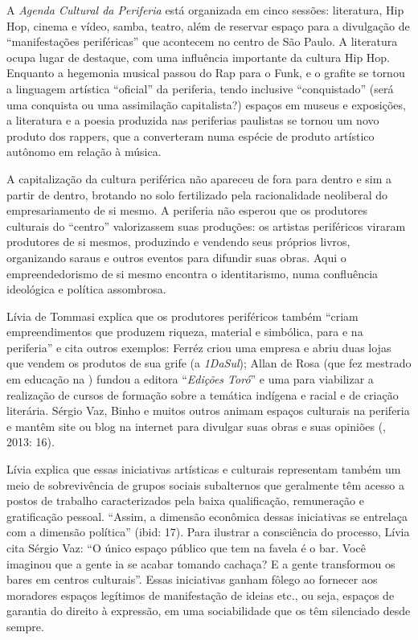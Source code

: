 A \emph{Agenda Cultural da Periferia} está organizada em cinco sessões:
literatura, Hip Hop, cinema e vídeo, samba, teatro, além de reservar
espaço para a divulgação de ``manifestações periféricas'' que acontecem
no centro de São Paulo. A literatura ocupa lugar de destaque, com uma
influência importante da cultura Hip Hop. Enquanto a hegemonia musical
passou do Rap para o Funk, e o grafite se tornou a linguagem artística
``oficial'' da periferia, tendo inclusive ``conquistado'' (será uma
conquista ou uma assimilação capitalista?) espaços em museus e
exposições, a literatura e a poesia produzida nas periferias paulistas
se tornou um novo produto dos rappers, que a converteram numa espécie de
produto artístico autônomo em relação à música.

A capitalização da cultura periférica não apareceu de fora para dentro e
sim a partir de dentro, brotando no solo fertilizado pela racionalidade
neoliberal do empresariamento de si mesmo. A periferia não esperou que
os produtores culturais do ``centro'' valorizassem suas produções: os
artistas periféricos viraram produtores de si mesmos, produzindo e
vendendo seus próprios livros, organizando saraus e outros eventos para
difundir suas obras. Aqui o empreendedorismo de si mesmo encontra o
identitarismo, numa confluência ideológica e política assombrosa.

Lívia de Tommasi explica que os produtores periféricos também ``criam
empreendimentos que produzem riqueza, material e simbólica, para e na
periferia'' e cita outros exemplos: Ferréz criou uma empresa e abriu
duas lojas que vendem os produtos de sua grife (a \emph{1DaSul}); Allan
de Rosa (que fez mestrado em educação na ) fundou a editora
``\emph{Edições Toró}'' e uma  para viabilizar a realização de cursos
de formação sobre a temática indígena e racial e de criação literária.
Sérgio Vaz, Binho e muitos outros animam espaços culturais na periferia
e mantêm site ou blog na internet para divulgar suas obras e suas
opiniões (, 2013: 16).

Lívia explica que essas iniciativas artísticas e culturais representam
também um meio de sobrevivência de grupos sociais subalternos que
geralmente têm acesso a postos de trabalho caracterizados pela baixa
qualificação, remuneração e gratificação pessoal. ``Assim, a dimensão
econômica dessas iniciativas se entrelaça com a dimensão política''
(ibid: 17). Para ilustrar a consciência do processo, Lívia cita Sérgio
Vaz: ``O único espaço público que tem na favela é o bar. Você imaginou
que a gente ia se acabar tomando cachaça? E a gente transformou os bares
em centros culturais''. Essas iniciativas ganham fôlego ao fornecer aos
moradores espaços legítimos de manifestação de ideias etc., ou seja,
espaços de garantia do direito à expressão, em uma sociabilidade que os
têm silenciado desde sempre.

